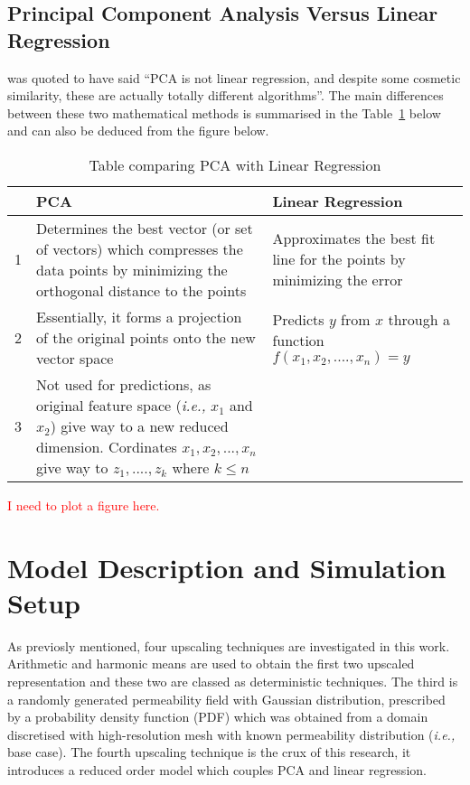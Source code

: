\documentclass[preprint,12pt]{elsarticle}
\newcommand{\red}{\textcolor{red}}
\newcommand{\ie}{{\it i.e., }}
\begin{document}
\subsection{Principal Component Analysis Versus Linear Regression}\label{subsection:pcs_vs_linreg}

\citet{AndrewNg_2018} was quoted to have said ``PCA is not linear regression, and despite some cosmetic similarity, these are actually totally different algorithms''. The main differences between these two mathematical methods is summarised in the Table~\ref{table:pca_vs_linreg} below and can also be deduced from the figure below.

\begin{table}[h!]
\centering
\begin{tabular}{|m{1em} |m{14em} |m{14em}|} 
 \hline
  & PCA & Linear Regression \\ [0.5ex] 
 \hline
 1 & Determines the best vector (or set of vectors) which compresses the data points by minimizing the orthogonal distance to the points & Approximates the best fit line for the points by minimizing the error \\
 \hline
 2 & Essentially, it forms a projection of the original points onto the new vector space & Predicts $y$ from $x$ through a function $f(x_1,x_2,....,x_n) = y$ \\
 \hline
 3 & Not used for predictions, as original feature space (\ie $x_1$ and $x_2$) give way to a new reduced dimension. Cordinates $x_1, x_2,...,x_n$ give way to $z_1,....,z_k$ where $k \leq n$ & \\[1ex]
 \hline
\end{tabular}
\caption{Table comparing PCA with Linear Regression}
\label{table:pca_vs_linreg}
\end{table}





\red{I need to plot a figure here.}



\section{Model Description and Simulation Setup}\label{section:model_simulation}

As previosly mentioned, four upscaling techniques are investigated in this work. Arithmetic and harmonic means are used to obtain the first two upscaled representation and these two are classed as deterministic techniques. The third is a randomly generated permeability field with Gaussian distribution, prescribed by a probability density function (PDF) which was obtained from a domain discretised with high-resolution mesh with known permeability distribution (\ie base case). The fourth upscaling technique is the crux of this research, it introduces a reduced order model which couples PCA and linear regression.
\end{document}
